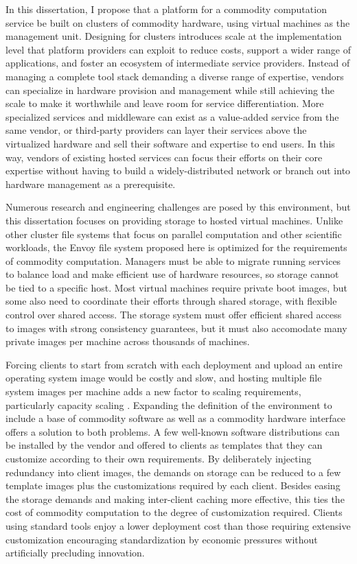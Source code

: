 In this dissertation, I propose that a platform for a commodity computation service be built on clusters of commodity hardware, using virtual machines as the management unit. Designing for clusters introduces scale at the implementation level that platform providers can exploit to reduce costs, support a wider range of applications, and foster an ecosystem of intermediate service providers. Instead of managing a complete tool stack demanding a diverse range of expertise, vendors can specialize in hardware provision and management while still achieving the scale to make it worthwhile and leave room for service differentiation. More specialized services and middleware can exist as a value-added service from the same vendor, or third-party providers can layer their services above the virtualized hardware and sell their software and expertise to end users. In this way, vendors of existing hosted services can focus their efforts on their core expertise without having to build a widely-distributed network or branch out into hardware management as a prerequisite.

Numerous research and engineering challenges are posed by this environment, but this dissertation focuses on providing storage to hosted virtual machines. Unlike other cluster file systems that focus on parallel computation and other scientific workloads, the Envoy file system proposed here is optimized for the requirements of commodity computation. Managers must be able to migrate running services to balance load and make efficient use of hardware resources, so storage cannot be tied to a specific host. Most virtual machines require private boot images, but some also need to coordinate their efforts through shared storage, with flexible control over shared access. The storage system must offer efficient shared access to images with strong consistency guarantees, but it must also accomodate many private images per machine across thousands of machines.

Forcing clients to start from scratch with each deployment and upload an entire operating system image would be costly and slow, and hosting multiple file system images per machine adds a new factor to scaling requirements, particularly capacity scaling \cite{warfield}. Expanding the definition of the environment to include a base of commodity software as well as a commodity hardware interface offers a solution to both problems. A few well-known software distributions can be installed by the vendor and offered to clients as templates that they can customize according to their own requirements. By deliberately injecting redundancy into client images, the demands on storage can be reduced to a few template images plus the customizations required by each client. Besides easing the storage demands and making inter-client caching more effective, this ties the cost of commodity computation to the degree of customization required. Clients using standard tools enjoy a lower deployment cost than those requiring extensive customization encouraging standardization by economic pressures without artificially precluding innovation.

